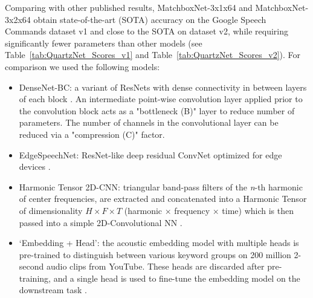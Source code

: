 \documentclass[a4paper]{article}
\begin{document}
Comparing with other published results, MatchboxNet-3x1x64 and MatchboxNet-3x2x64 obtain state-of-the-art (SOTA) accuracy on the Google Speech Commands dataset v1 and close to the SOTA on dataset v2, while requiring significantly fewer parameters than other models 
(see Table~\ref{tab:QuartzNet_Scores_v1} and Table~\ref{tab:QuartzNet_Scores_v2}).
For comparison we used the following models:
\begin{itemize}
    \item DenseNet-BC: a variant of ResNets with dense connectivity in between layers of each block \cite{huang2016}. An intermediate point-wise convolution layer applied prior to the convolution block acts as a "bottleneck (B)" layer to reduce number of parameters. The number of channels in the convolutional layer can be reduced via a "compression (C)" factor.
    \item EdgeSpeechNet: ResNet-like deep residual ConvNet  optimized for edge devices \cite{lin2018edgespeechnets}.
    \item Harmonic Tensor 2D-CNN: triangular band-pass filters of the \textit{n}-th harmonic of center frequencies, are extracted and concatenated into a Harmonic Tensor of dimensionality $H \times F \times T$ (harmonic $\times$ frequency $\times$ time) which is then passed into a simple 2D-Convolutional NN \cite{won2020harmonic}.
    \item `Embedding + Head': the acoustic embedding model with multiple heads is pre-trained to distinguish between various keyword groups on 200 million 2-second audio clips from YouTube. These heads are discarded after pre-training, and a single head is used to fine-tune the embedding model on the downstream task \cite{lin2020training}.
\end{itemize}

{\renewcommand{\arraystretch}{1.1}
\begin{table}[!h]
\caption{MatchboxNet on Google Speech Commands dataset v1, the accuracy is averaged over 5 trials (95\% Confidence Interval).}
\label{tab:QuartzNet_Scores_v1}
\centering
{}
\end{table}
}
\end{document}
